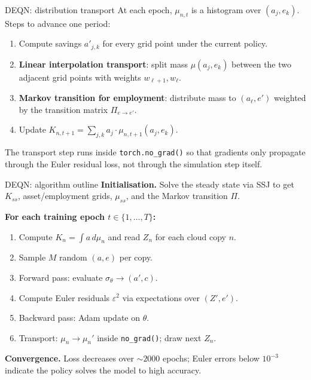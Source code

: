 \begin{frame}{DEQN: distribution transport}
At each epoch, $\mu_{n,t}$ is a histogram over $(a_j, e_k)$. Steps to advance one period:
\medskip

\begin{enumerate}
\item Compute savings $a'_{j,k}$ for every grid point under the current policy.
\item \textbf{Linear interpolation transport}: split mass $\mu(a_j, e_k)$ between the two adjacent grid points with weights $w_{\ell+1}, w_\ell$.
\item \textbf{Markov transition for employment}: distribute mass to $(a_\ell, e')$ weighted by the transition matrix $\Pi_{e\to e'}$.
\item Update $K_{n,t+1} = \sum_{j,k} a_j \cdot \mu_{n,t+1}(a_j, e_k)$.
\end{enumerate}
\medskip

The transport step runs inside \texttt{torch.no\_grad()} so that gradients only propagate through the Euler residual loss, not through the simulation step itself.
\end{frame}

\begin{frame}{DEQN: algorithm outline}
\textbf{Initialisation.} Solve the steady state via SSJ to get $K_{ss}$, asset/employment grids, $\mu_{ss}$, and the Markov transition $\Pi$.
\medskip

\textbf{For each training epoch $t \in \{1,\ldots,T\}$:}
\begin{enumerate}
\item Compute $K_n = \int a\,d\mu_n$ and read $Z_n$ for each cloud copy $n$.
\item Sample $M$ random $(a, e)$ per copy.
\item Forward pass: evaluate $\sigma_\theta \to (a', c)$.
\item Compute Euler residuals $\varepsilon^2$ via expectations over $(Z', e')$.
\item Backward pass: Adam update on $\theta$.
\item Transport: $\mu_n \to \mu_n'$ inside \texttt{no\_grad()}; draw next $Z_n$.
\end{enumerate}
\medskip

\textbf{Convergence.} Loss decreases over $\sim 2000$ epochs; Euler errors below $10^{-3}$ indicate the policy solves the model to high accuracy.
\end{frame}

